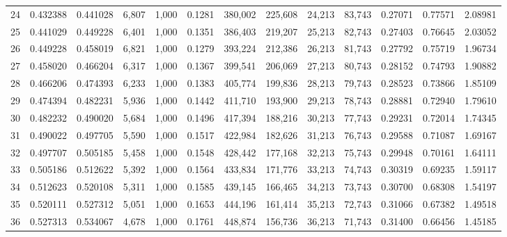 \begin{tabular}{rrrrrrrrrrrrr}
24  &  0.432388 &  0.441028 &   6,807 &  1,000 &                                     0.1281 &  380,002 &  225,608 &   24,213 &   83,743 &  0.27071 &  0.77571 &  2.08981 \\
25  &  0.441029 &  0.449228 &   6,401 &  1,000 &                                     0.1351 &  386,403 &  219,207 &   25,213 &   82,743 &  0.27403 &  0.76645 &  2.03052 \\
26  &  0.449228 &  0.458019 &   6,821 &  1,000 &                                     0.1279 &  393,224 &  212,386 &   26,213 &   81,743 &  0.27792 &  0.75719 &  1.96734 \\
27  &  0.458020 &  0.466204 &   6,317 &  1,000 &                                     0.1367 &  399,541 &  206,069 &   27,213 &   80,743 &  0.28152 &  0.74793 &  1.90882 \\
28  &  0.466206 &  0.474393 &   6,233 &  1,000 &                                     0.1383 &  405,774 &  199,836 &   28,213 &   79,743 &  0.28523 &  0.73866 &  1.85109 \\
29  &  0.474394 &  0.482231 &   5,936 &  1,000 &                                     0.1442 &  411,710 &  193,900 &   29,213 &   78,743 &  0.28881 &  0.72940 &  1.79610 \\
30  &  0.482232 &  0.490020 &   5,684 &  1,000 &                                     0.1496 &  417,394 &  188,216 &   30,213 &   77,743 &  0.29231 &  0.72014 &  1.74345 \\
31  &  0.490022 &  0.497705 &   5,590 &  1,000 &                                     0.1517 &  422,984 &  182,626 &   31,213 &   76,743 &  0.29588 &  0.71087 &  1.69167 \\
32  &  0.497707 &  0.505185 &   5,458 &  1,000 &                                     0.1548 &  428,442 &  177,168 &   32,213 &   75,743 &  0.29948 &  0.70161 &  1.64111 \\
33  &  0.505186 &  0.512622 &   5,392 &  1,000 &                                     0.1564 &  433,834 &  171,776 &   33,213 &   74,743 &  0.30319 &  0.69235 &  1.59117 \\
34  &  0.512623 &  0.520108 &   5,311 &  1,000 &                                     0.1585 &  439,145 &  166,465 &   34,213 &   73,743 &  0.30700 &  0.68308 &  1.54197 \\
35  &  0.520111 &  0.527312 &   5,051 &  1,000 &                                     0.1653 &  444,196 &  161,414 &   35,213 &   72,743 &  0.31066 &  0.67382 &  1.49518 \\
36  &  0.527313 &  0.534067 &   4,678 &  1,000 &                                     0.1761 &  448,874 &  156,736 &   36,213 &   71,743 &  0.31400 &  0.66456 &  1.45185 \\

\end{tabular}
